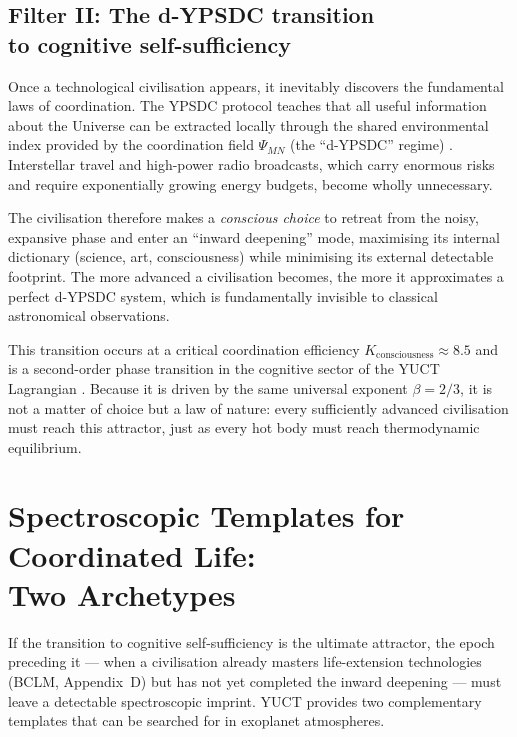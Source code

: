 \documentclass[12pt,a4paper]{article}
\begin{document}
	\subsection{Filter II: The d-YPSDC transition\\
		to cognitive self-sufficiency}
	\label{sec:filter2}
	Once a technological civilisation appears, it inevitably discovers the
	fundamental laws of coordination.  The YPSDC protocol teaches that all
	useful information about the Universe can be extracted locally through
	the shared environmental index provided by the coordination field
	$\Psi_{MN}$ (the ``d-YPSDC'' regime) \citep{AppOmega, AppT}.
	Interstellar travel and high-power radio broadcasts, which carry
	enormous risks and require exponentially growing energy budgets, become
	wholly unnecessary.
	
	The civilisation therefore makes a \emph{conscious choice} to retreat
	from the noisy, expansive phase and enter an ``inward deepening'' mode,
	maximising its internal dictionary (science, art, consciousness) while
	minimising its external detectable footprint.  The more advanced a
	civilisation becomes, the more it approximates a perfect d-YPSDC
	system, which is fundamentally invisible to classical astronomical
	observations.
	
	This transition occurs at a critical coordination efficiency
	$K_{\mathrm{consciousness}}\approx 8.5$ and is a second-order phase
	transition in the cognitive sector of the YUCT Lagrangian
	\citep{AppH}.  Because it is driven by the same universal exponent
	$\beta=2/3$, it is not a matter of choice but a law of nature: every
	sufficiently advanced civilisation must reach this attractor, just as
	every hot body must reach thermodynamic equilibrium.
	
	\section{Spectroscopic Templates for Coordinated Life:\\
		Two Archetypes}
	\label{sec:spectra}
	
	If the transition to cognitive self-sufficiency is the ultimate
	attractor, the epoch preceding it --- when a civilisation already
	masters life-extension technologies (BCLM, Appendix~D) but has not yet
	completed the inward deepening --- must leave a detectable
	spectroscopic imprint.  YUCT provides two complementary templates that
	can be searched for in exoplanet atmospheres.
	
\end{document}
